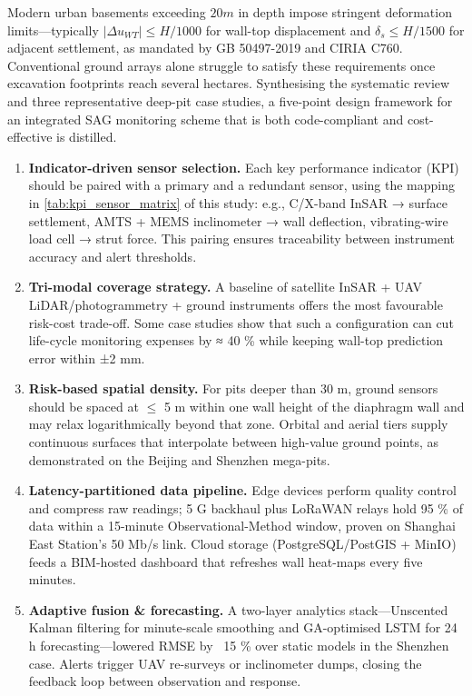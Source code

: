\documentclass[preprint,11pt,authoryear,3p]{elsarticle}
\begin{document}
Modern urban basements exceeding $20 m$ in depth impose stringent deformation limits—typically $|\Delta u_{WT}| \le H / 1000$ for wall-top displacement and $\delta_{s} \le H / 1500$ for adjacent settlement, as mandated by GB 50497-2019 and CIRIA C760. Conventional ground arrays alone struggle to satisfy these requirements once excavation footprints reach several hectares. Synthesising the systematic review and three representative deep-pit case studies, a five-point design framework for an integrated SAG monitoring scheme that is both code-compliant and cost-effective is distilled.

\begin{enumerate}
  \item \textbf{Indicator-driven sensor selection.} Each key performance indicator (KPI) should be paired with a primary and a redundant sensor, using the mapping in \autoref{tab:kpi_sensor_matrix} of this study: e.g., C/X-band InSAR → surface settlement, AMTS + MEMS inclinometer → wall deflection, vibrating-wire load cell → strut force. This pairing ensures traceability between instrument accuracy and alert thresholds.
  \item \textbf{Tri-modal coverage strategy.} A baseline of satellite InSAR + UAV LiDAR/photogrammetry + ground instruments offers the most favourable risk-cost trade-off. Some case studies show that such a configuration can cut life-cycle monitoring expenses by ≈ 40 \% while keeping wall-top prediction error within ±2 mm.
  \item \textbf{Risk-based spatial density.} For pits deeper than 30 m, ground sensors should be spaced at $\le$ 5 m within one wall height of the diaphragm wall and may relax logarithmically beyond that zone. Orbital and aerial tiers supply continuous surfaces that interpolate between high-value ground points, as demonstrated on the Beijing and Shenzhen mega-pits.
  \item \textbf{Latency-partitioned data pipeline.} Edge devices perform quality control and compress raw readings; 5 G backhaul plus LoRaWAN relays hold 95 \% of data within a 15-minute Observational-Method window, proven on Shanghai East Station's 50 Mb/s link. Cloud storage (PostgreSQL/PostGIS + MinIO) feeds a BIM-hosted dashboard that refreshes wall heat-maps every five minutes.
  \item \textbf{Adaptive fusion \& forecasting.} A two-layer analytics stack—Unscented Kalman filtering for minute-scale smoothing and GA-optimised LSTM for 24 h forecasting—lowered RMSE by ~15 \% over static models in the Shenzhen case. Alerts trigger UAV re-surveys or inclinometer dumps, closing the feedback loop between observation and response.
\end{enumerate}
\end{document}

